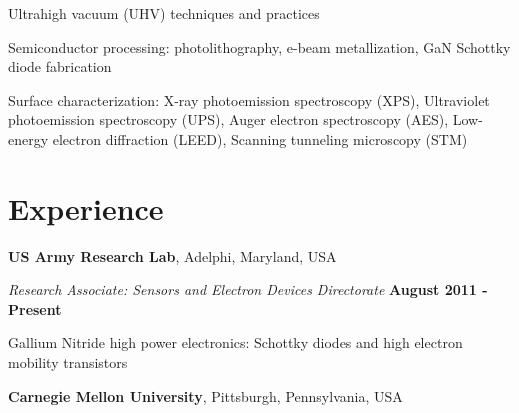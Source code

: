 \documentclass[letterpaper,margin,line]{res}
\newenvironment{list1}{
  \begin{list}{\ding{113}}{%
      \setlength{\itemsep}{0in}
      \setlength{\parsep}{0in} \setlength{\parskip}{0in}
      \setlength{\topsep}{0in} \setlength{\partopsep}{0in} 
      \setlength{\leftmargin}{0.17in}}}{\end{list}}
\begin{document}
\begin{resume}
\vspace*{-2.5mm}
Ultrahigh vacuum (UHV) techniques and practices

\vspace*{-2.5mm}
Semiconductor processing: photolithography, e-beam metallization, GaN Schottky diode fabrication

\vspace*{-2.5mm}
Surface characterization: X-ray photoemission spectroscopy (XPS), Ultraviolet photoemission spectroscopy (UPS), Auger electron spectroscopy (AES), Low-energy electron diffraction (LEED), Scanning tunneling microscopy (STM)




\section{\sc Experience}
{\bf US Army Research Lab}, Adelphi, Maryland, USA

\vspace{-.3cm}
{\em Research Associate: Sensors and Electron Devices Directorate} \hfill {\bf August 2011 - Present}\\
\begin{list1}
\item[] Gallium Nitride high power electronics: Schottky diodes and high electron mobility transistors
\end{list1}



{\bf Carnegie Mellon University}, Pittsburgh, Pennsylvania, USA


\end{resume}
\end{document}
